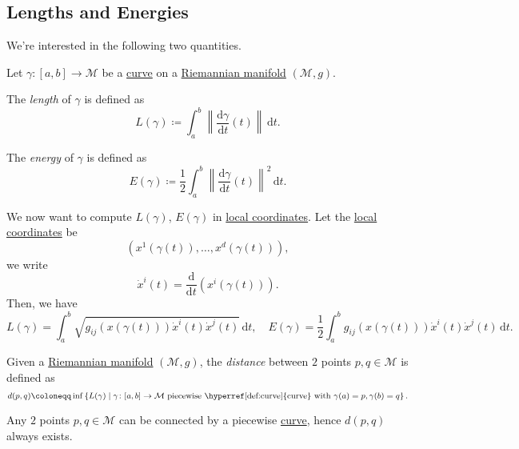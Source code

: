 \subsection{Lengths and Energies}
We're interested in the following two quantities.

\begin{definition*}
	Let \(\gamma \colon [a, b] \to \mathcal{M} \) be a \hyperref[def:curve]{curve} on a \hyperref[def:Riemannian-manifold]{Riemannian manifold} \((\mathcal{M} , g)\).

	\begin{definition}[Length]\label{def:length}
		The \emph{length} of \(\gamma \) is defined as
		\[
			L(\gamma ) \coloneqq \int_{a}^{b} \left\lVert \frac{\mathrm{d}\gamma }{\mathrm{d}t} (t) \right\rVert \,\mathrm{d}t .
		\]
	\end{definition}

	\begin{definition}[Energy]\label{def:energy}
		The \emph{energy} of \(\gamma \) is defined as
		\[
			E(\gamma )\coloneqq \frac{1}{2} \int_{a}^{b} \left\lVert \frac{\mathrm{d}\gamma }{\mathrm{d}t} (t) \right\rVert ^2 \,\mathrm{d}t .
		\]
	\end{definition}
\end{definition*}

We now want to compute \(L(\gamma )\), \(E(\gamma )\) in \hyperref[def:coordinate-chart]{local coordinates}. Let the \hyperref[def:coordinate-chart]{local coordinates} be
\[
	(x^1(\gamma (t)), \dots , x^d(\gamma (t))),
\]
we write
\[
	\dot{x}^i (t) = \frac{\mathrm{d}}{\mathrm{d}t} (x^i (\gamma (t))).
\]
Then, we have
\[
	L(\gamma ) = \int_{a}^{b} \sqrt{g_{ij} (x(\gamma (t))) \dot{x}^i(t)\dot{x}^j(t)} \,\mathrm{d}t, \quad
	E(\gamma ) = \frac{1}{2} \int_{a}^{b} g_{ij} (x(\gamma (t))) \dot{x}^i(t)\dot{x}^j(t) \,\mathrm{d}t.
\]

\begin{definition}[Distance]\label{def:distance}
	Given a \hyperref[def:Riemannian-manifold]{Riemannian manifold} \((\mathcal{M} , g)\), the \emph{distance} between \(2\) points \(p, q\in \mathcal{M} \) is defined as
	\[
		d(p, q)\coloneqq \inf \left\{ L(\gamma ) \mid \gamma \colon [a, b]\to \mathcal{M} \text{ piecewise \hyperref[def:curve]{curve} with }\gamma (a)=p, \gamma (b)=q \right\} .
	\]
\end{definition}

\begin{note}
	Any \(2\) points \(p, q\in \mathcal{M} \) can be connected by a piecewise \hyperref[def:curve]{curve}, hence \(d(p, q)\) always exists.
\end{note}

